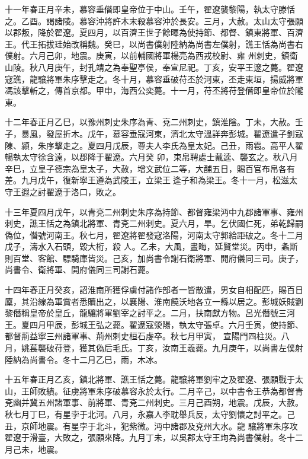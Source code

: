\begin{pinyinscope}
 十一年春正月辛未，慕容垂僭即皇帝位于中山。壬午，翟遼襲黎陽，執太守滕恬之。乙酉。謁諸陵。慕容沖將許木末殺慕容沖於長安。三月，大赦。太山太守張願以郡叛，降於翟遼。夏四月，以百濟王世子餘暉為使持節、都督、鎮東將軍、百濟王。代王拓拔珪始改稱魏。癸巳，以尚書僕射陸納為尚書左僕射，譙王恬為尚書右僕射。六月己卯，地震。庚寅，以前輔國將軍楊亮為西戎校尉、雍
 州刺史，鎮衛山陵。秋八月庚午，封孔靖之為奉聖亭侯，奉宣尼祀。丁亥，安平王邃之薨。翟遼寇譙，龍驤將軍朱序擊走之。冬十月，慕容垂破苻丕於河東，丕走東垣，揚威將軍馮該擊斬之，傳首京都。甲申，海西公奕薨。十一月，苻丕將苻登僭即皇帝位於隴東。



 十二年春正月乙巳，以豫州刺史朱序為青、兗二州刺史，鎮淮陰。丁未，大赦。壬子，暴風，發屋折木。戊午，慕容垂寇河東，濟北太守溫詳奔彭城。翟遼遣子釗寇陳、潁，朱序擊走之。夏四月戊辰，尊夫人李氏為皇太妃。己丑，雨雹。高平人翟暢執太守徐含遠，以郡降于翟遼。六月癸
 卯，束帛聘處士戴逵、襲玄之。秋八月辛巳，立皇子德宗為皇太子，大赦，增文武位二等，大酺五日，賜百官布帛各有差。九月戊午，復新寧王遵為武陵王，立梁王逢子和為梁王。冬十一月，松滋太守王遐之討翟遼于洛口，敗之。



 十三年夏四月戊午，以青兗二州刺史朱序為持節、都督雍梁沔中九郡諸軍事、雍州刺史，譙王恬之為鎮北將軍、青兗二州刺史。夏六月，旱。乞伏國仁死，弟乾歸嗣偽位，僭號河南王。秋七月，翟遼將翟發寇洛陽，河南太守郭給距破之。冬十二月戊子，濤水入石頭，毀大桁，殺
 人。乙未，大風，晝晦，延賢堂災。丙申，螽斯則百堂、客館、驃騎庫皆災。己亥，加尚書令謝石衛將軍、開府儀同三司。庚子，尚書令、衛將軍、開府儀同三司謝石薨。



 十四年春正月癸亥，詔淮南所獲俘虜付諸作部者一皆散遣，男女自相配匹，賜百日廩，其沿線為軍賞者悉贖出之，以襄陽、淮南饒沃地各立一縣以居之。彭城妖賊劉黎僭稱皇帝於皇丘，龍驤將軍劉宰之討平之。二月，扶南獻方物。呂光僭號三河王。夏四月甲辰，彭城王弘之薨。翟遼寇滎陽，執太守張卓。六月壬寅，使持節、都督荊益寧三州諸軍事、荊州刺史桓石虔卒。秋七月甲寅，
 宣陽門四柱災。八月，姚萇襲破苻登，獲其偽后毛氏。丁亥，汝南王羲薨。九月庚午，以尚書左僕射陸納為尚書令。冬十二月乙巳，雨，木冰。



 十五年春正月乙亥，鎮北將軍、譙王恬之薨。龍驤將軍劉牢之及翟遼、張願戰于太山，王師敗績。征虜將軍朱序破慕容永於太行。二月辛己，以中書令王恭為都督青兗幽并冀五州諸軍事、前將軍、青兗二州刺史。三月己酉朔，地震。戊辰，大赦。秋七月丁巳，有星孛于北河。八月，永嘉人李耽舉兵反，太守劉懷之討平之。己丑，京師地震。有星孛于北斗，犯紫微。沔中諸郡及兗州大水。龍
 驤將軍朱序攻翟遼于滑臺，大敗之，張願來降。九月丁未，以吳郡太守王珣為尚書僕射。冬十二月己未，地震。




\end{pinyinscope}
